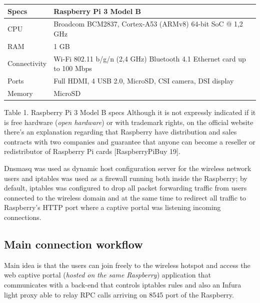 \documentclass[12pt]{amsart}
\begin{document}
\begin{multicols}{2}
\begin{center}
\vspace{0.35cm}

\begin{tabular}{ | m{} | m{} | }
 \hline
 Specs & Raspberry Pi 3 Model B \\
 \hline
 CPU & Broadcom BCM2837, Cortex-A53 (ARMv8) 64-bit SoC @ 1,2 GHz \\
\hline
 RAM & 1 GB \\
\hline
 Connectivity & Wi-Fi 802.11 b/g/n (2,4 GHz) Bluetooth 4.1 Ethernet card up to 100 Mbps \\
\hline
 Ports & Full HDMI, 4 USB 2.0, MicroSD, CSI camera, DSI display \\
\hline
 Memory & MicroSD \\
\hline
\end{tabular}
\end{center}
\vspace{0.15cm}
Table 1. Raspberry Pi 3 Model B specs
Although it is not expressly indicated if it is free hardware
(\textit{open hardware}) or with trademark rights, on the
official website there's an explanation regarding
that Raspberry have distribution and sales contracts with
two companies and guarantee that anyone can become a reseller or
redistributor of Raspberry Pi cards [RaspberryPiBuy 19].

\vspace{0.35cm}

Dnsmasq\cite{dnsmasq} was used
as dynamic host configuration server for the wireless
network users and
iptables\cite{iptables} was used as a firewall running
both inside the Raspberry; by default, iptables
was configured to
drop all packet
forwarding traffic from users connected to the wireless
domain and at the same time to redirect all
traffic to Raspberry's HTTP port where a
captive portal was listening incoming connections.


\subsection{Main connection workflow}

\vspace{0.35cm}

Main idea is that the users can join freely
to the wireless hotspot and access the web captive portal
(\textit{hosted on the same Raspberry}) application that
communicates with a back-end that controls iptables
rules and also an Infura light proxy able to relay RPC
calls arriving on 8545 port of the Raspberry.


\end{multicols}
\end{document}
